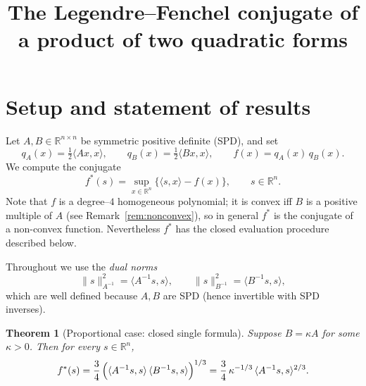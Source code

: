 \documentclass{amsart}
\newtheorem{theorem}{Theorem}
\theoremstyle{definition}
\begin{document}
\title{The Legendre--Fenchel conjugate of a product of two quadratic forms}
\maketitle

\section{Setup and statement of results}

Let $A,B\in\mathbb R^{n\times n}$ be symmetric positive definite (SPD), and set
\[
q_A(x)=\tfrac12\langle Ax,x\rangle,\qquad q_B(x)=\tfrac12\langle Bx,x\rangle ,\qquad
f(x)=q_A(x)\,q_B(x).
\]
We compute the conjugate
\[
f^\ast(s)=\sup_{x\in\mathbb R^n}\bigl\{\langle s,x\rangle-f(x)\bigr\},\qquad s\in\mathbb R^n .
\]
Note that $f$ is a degree--$4$ homogeneous polynomial; it is convex iff $B$ is a positive multiple
of $A$ (see Remark~\ref{rem:nonconvex}), so in general $f^\ast$ is the conjugate of a non-convex
function.  Nevertheless $f^\ast$ has the closed evaluation procedure described below.

Throughout we use the \emph{dual norms}
\[
\|s\|_{A^{-1}}^2=\langle A^{-1}s,s\rangle,\qquad \|s\|_{B^{-1}}^2=\langle B^{-1}s,s\rangle ,
\]
which are well defined because $A,B$ are SPD (hence invertible with SPD inverses).

\begin{theorem}[Proportional case: closed single formula]\label{thm:prop}
Suppose $B=\kappa A$ for some $\kappa>0$.  Then for every $s\in\mathbb R^n$,
\begin{equation}\label{eq:prop}
f^\ast(s)=\frac34\,\Bigl(\langle A^{-1}s,s\rangle\,\langle B^{-1}s,s\rangle\Bigr)^{1/3}
        =\frac34\,\kappa^{-1/3}\,\langle A^{-1}s,s\rangle^{2/3}.
\end{equation}
\end{theorem}
\end{document}
